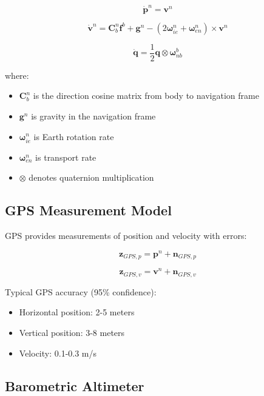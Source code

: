 \documentclass[12pt,a4paper]{article}
\begin{document}
\begin{equation}
\dot{\mathbf{p}}^n = \mathbf{v}^n
\end{equation}

\begin{equation}
\dot{\mathbf{v}}^n = \mathbf{C}_b^n \mathbf{f}^b + \mathbf{g}^n - (2\boldsymbol{\omega}_{ie}^n + \boldsymbol{\omega}_{en}^n) \times \mathbf{v}^n
\end{equation}

\begin{equation}
\dot{\mathbf{q}} = \frac{1}{2}\mathbf{q} \otimes \boldsymbol{\omega}_{nb}^b
\end{equation}

where:
\begin{itemize}
    \item $\mathbf{C}_b^n$ is the direction cosine matrix from body to navigation frame
    \item $\mathbf{g}^n$ is gravity in the navigation frame
    \item $\boldsymbol{\omega}_{ie}^n$ is Earth rotation rate
    \item $\boldsymbol{\omega}_{en}^n$ is transport rate
    \item $\otimes$ denotes quaternion multiplication
\end{itemize}

\subsection{GPS Measurement Model}

GPS provides measurements of position and velocity with errors:

\begin{equation}
\mathbf{z}_{GPS,p} = \mathbf{p}^n + \mathbf{n}_{GPS,p}
\end{equation}

\begin{equation}
\mathbf{z}_{GPS,v} = \mathbf{v}^n + \mathbf{n}_{GPS,v}
\end{equation}

Typical GPS accuracy (95\% confidence):
\begin{itemize}
    \item Horizontal position: 2-5 meters
    \item Vertical position: 3-8 meters
    \item Velocity: 0.1-0.3 m/s
\end{itemize}

\subsection{Barometric Altimeter}
\end{document}
